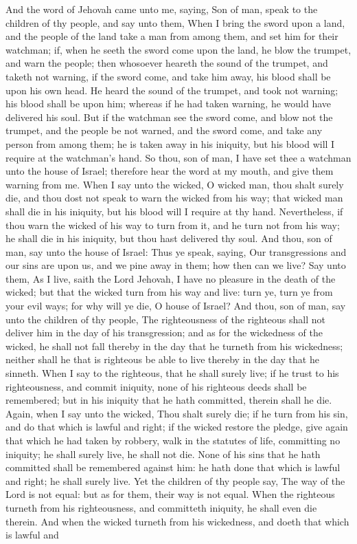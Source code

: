 And the word of Jehovah came unto me, saying, Son of man, speak to the children of thy people, and say unto them, When I bring the sword upon a land, and the people of the land take a man from among them, and set him for their watchman; if, when he seeth the sword come upon the land, he blow the trumpet, and warn the people; then whosoever heareth the sound of the trumpet, and taketh not warning, if the sword come, and take him away, his blood shall be upon his own head. He heard the sound of the trumpet, and took not warning; his blood shall be upon him; whereas if he had taken warning, he would have delivered his soul. But if the watchman see the sword come, and blow not the trumpet, and the people be not warned, and the sword come, and take any person from among them; he is taken away in his iniquity, but his blood will I require at the watchman’s hand.  So thou, son of man, I have set thee a watchman unto the house of Israel; therefore hear the word at my mouth, and give them warning from me. When I say unto the wicked, O wicked man, thou shalt surely die, and thou dost not speak to warn the wicked from his way; that wicked man shall die in his iniquity, but his blood will I require at thy hand. Nevertheless, if thou warn the wicked of his way to turn from it, and he turn not from his way; he shall die in his iniquity, but thou hast delivered thy soul.  And thou, son of man, say unto the house of Israel: Thus ye speak, saying, Our transgressions and our sins are upon us, and we pine away in them; how then can we live? Say unto them, As I live, saith the Lord Jehovah, I have no pleasure in the death of the wicked; but that the wicked turn from his way and live: turn ye, turn ye from your evil ways; for why will ye die, O house of Israel? And thou, son of man, say unto the children of thy people, The righteousness of the righteous shall not deliver him in the day of his transgression; and as for the wickedness of the wicked, he shall not fall thereby in the day that he turneth from his wickedness; neither shall he that is righteous be able to live thereby in the day that he sinneth. When I say to the righteous, that he shall surely live; if he trust to his righteousness, and commit iniquity, none of his righteous deeds shall be remembered; but in his iniquity that he hath committed, therein shall he die. Again, when I say unto the wicked, Thou shalt surely die; if he turn from his sin, and do that which is lawful and right; if the wicked restore the pledge, give again that which he had taken by robbery, walk in the statutes of life, committing no iniquity; he shall surely live, he shall not die. None of his sins that he hath committed shall be remembered against him: he hath done that which is lawful and right; he shall surely live.  Yet the children of thy people say, The way of the Lord is not equal: but as for them, their way is not equal. When the righteous turneth from his righteousness, and committeth iniquity, he shall even die therein. And when the wicked turneth from his wickedness, and doeth that which is lawful and 